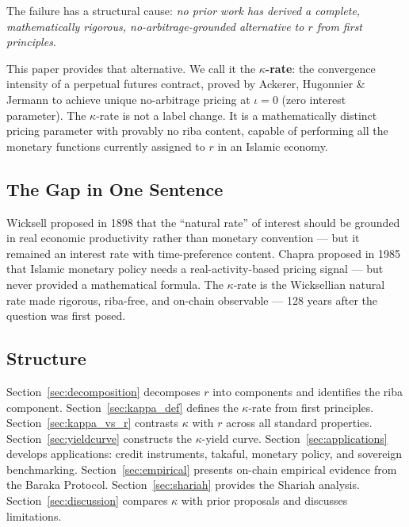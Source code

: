 \documentclass[10pt,twocolumn]{article}
\theoremstyle{plain}
\theoremstyle{definition}
\begin{document}
The failure has a structural cause: \emph{no prior work has
derived a complete, mathematically rigorous, no-arbitrage-grounded
alternative to $r$ from first principles}.

This paper provides that alternative. We call it the
\textbf{$\kappa$-rate}: the convergence intensity of a perpetual
futures contract, proved by Ackerer, Hugonnier \& Jermann
\cite{Ackerer2024} to achieve unique no-arbitrage pricing at
$\iota = 0$ (zero interest parameter). The $\kappa$-rate is not
a label change. It is a mathematically distinct pricing parameter
with provably no riba content, capable of performing all the
monetary functions currently assigned to $r$ in an Islamic economy.

\subsection*{The Gap in One Sentence}

Wicksell \cite{Wicksell1898} proposed in 1898 that the ``natural
rate'' of interest should be grounded in real economic productivity
rather than monetary convention --- but it remained an interest rate
with time-preference content. Chapra \cite{Chapra1985} proposed
in 1985 that Islamic monetary policy needs a real-activity-based
pricing signal --- but never provided a mathematical formula.
The $\kappa$-rate is the Wicksellian natural rate made rigorous,
riba-free, and on-chain observable --- 128 years after the question
was first posed.

\subsection*{Structure}

Section~\ref{sec:decomposition} decomposes $r$ into components and
identifies the riba component.
Section~\ref{sec:kappa_def} defines the $\kappa$-rate from first
principles.
Section~\ref{sec:kappa_vs_r} contrasts $\kappa$ with $r$ across
all standard properties.
Section~\ref{sec:yieldcurve} constructs the $\kappa$-yield curve.
Section~\ref{sec:applications} develops applications: credit
instruments, takaful, monetary policy, and sovereign benchmarking.
Section~\ref{sec:empirical} presents on-chain empirical evidence
from the Baraka Protocol.
Section~\ref{sec:shariah} provides the Shariah analysis.
Section~\ref{sec:discussion} compares $\kappa$ with prior proposals
and discusses limitations.

\end{document}
